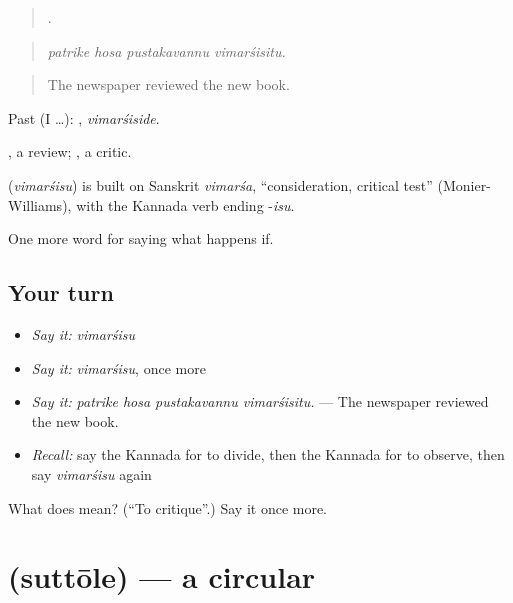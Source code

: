 \begin{quote}
   .
\end{quote}

\begin{quote}
\emph{patrike hosa pustakavannu vimarśisitu.}
\end{quote}

\begin{quote}
The newspaper reviewed the new book.
\end{quote}

Past (I …): , \emph{vimarśiside}.

, a review; , a critic.

\begin{cousinweb}
\textbf{} (\emph{vimarśisu}) is built on Sanskrit \emph{vimarśa}, \textquotedblleft{}consideration, critical test\textquotedblright{} (Monier-Williams), with the Kannada verb ending -\emph{isu}.
\end{cousinweb}

\begin{grammarlens}[title={What you've built}]
One more word for saying what happens if.
\end{grammarlens}

\subsection*{Your turn}
\begin{itemize}
\raggedright
  \item \emph{Say it:} \emph{vimarśisu}
  \item \emph{Say it:} \emph{vimarśisu}, once more
  \item \emph{Say it:} \emph{patrike hosa pustakavannu vimarśisitu.} — The newspaper reviewed the new book.
  \item \emph{Recall:} say the Kannada for to divide, then the Kannada for to observe, then say \emph{vimarśisu} again
\end{itemize}

\begin{tcolorbox}[breakable,colback=teal!4,colframe=teal!35!black,title={Before you move on}]
What does  mean? (\textquotedblleft{}To critique\textquotedblright{}.) Say it once more.
\end{tcolorbox}
\section[\texorpdfstring{\kn{ಸುತ್ತೋಲೆ} (suttōle)}{ಸುತ್ತೋಲೆ (suttōle)}]{ (suttōle) — a circular}

